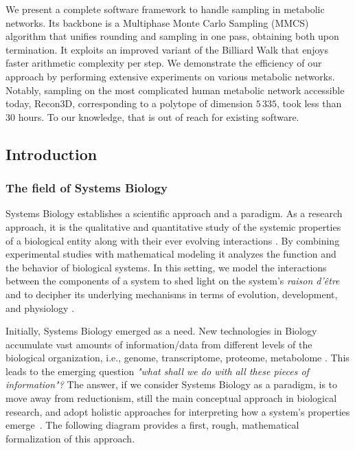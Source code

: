    We present a complete software framework to handle sampling in metabolic networks.
   Its backbone is a Multiphase Monte Carlo Sampling (MMCS) algorithm
   that unifies rounding and sampling in one pass, obtaining both upon termination.
   It exploits an
   improved variant of the Billiard Walk that enjoys faster arithmetic complexity per step.
   We demonstrate the efficiency of our approach by performing extensive experiments
   on various metabolic networks.
   Notably, sampling on the most complicated human metabolic network accessible today, Recon3D,
   corresponding to a polytope of dimension  $5\,335$, took less than $30$ hours.
   To our knowledge, that is out of reach for existing software.





\subsection{Introduction}
\label{sec:mmcs-intro}

   \subsubsection*{The field of Systems Biology}

   Systems Biology establishes a scientific approach and a paradigm. As a
   research approach, it is the qualitative and quantitative study of the systemic
   properties of a biological entity along with their ever evolving interactions
   \cite{klipp2016systems, kohl2010systems}.
   By combining experimental studies  with mathematical
   modeling it analyzes the function and the behavior of biological systems.
   In this setting, we model the interactions between the  components of a system
   to shed light  on the system's \textit{raison d'être} and to decipher its underlying mechanisms
   in terms of evolution, development, and physiology \cite{ideker2001new}.

   Initially, Systems Biology emerged as a need. New technologies in Biology
   accumulate vast amounts of information/data from different levels of the
   biological organization, i.e., genome, transcriptome, proteome, metabolome
   \cite{quinn2016sample}. This leads to the emerging question \textit{"what shall
   we do with all these pieces of information"?} The answer, if we consider
   Systems Biology as a paradigm, is to move away from reductionism, still the main
   conceptual approach in biological research, and adopt holistic approaches for
   interpreting how a system's properties emerge~\cite{noble2008music}. The
   following diagram provides a first, rough, mathematical formalization of this
   approach.

